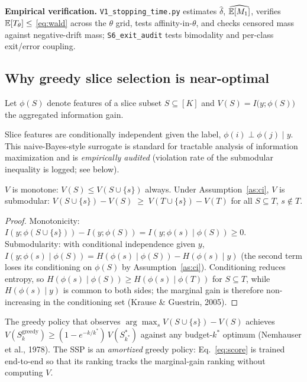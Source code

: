 \noindent\textbf{Empirical verification.} \texttt{V1\_stopping\_time.py}
estimates $\hat\delta$, $\widehat{\mathbb{E}[M_1]}$, verifies
$\mathbb{E}[T_\theta]\le$ \eqref{eq:wald} across the $\theta$ grid, tests
affinity-in-$\theta$, and checks censored mass against negative-drift mass;
\texttt{S6\_exit\_audit} tests bimodality and per-class exit/error coupling.

\subsection{Why greedy slice selection is near-optimal}

Let $\phi(S)$ denote features of a slice subset $S\subseteq[K]$ and
$V(S)=I\big(y;\phi(S)\big)$ the aggregated information gain.

\begin{assumption}\label{as:ci}
Slice features are conditionally independent given the label,
$\phi(i)\perp\phi(j)\mid y$. This naive-Bayes-style surrogate is standard
for tractable analysis of information maximization and is
\emph{empirically audited} (violation rate of the submodular inequality is
logged; see below).
\end{assumption}

\begin{theorem}\label{thm:submod}
$V$ is monotone: $V(S)\le V(S\cup\{s\})$ always. Under
Assumption~\ref{as:ci}, $V$ is submodular:
$V(S\cup\{s\})-V(S)\;\ge\;V(T\cup\{s\})-V(T)$ for all $S\subseteq T$,
$s\notin T$.
\end{theorem}
\begin{proof}
Monotonicity: $I(y;\phi(S\cup\{s\}))-I(y;\phi(S)) =
I(y;\phi(s)\mid\phi(S))\ge 0$. Submodularity: with conditional
independence given $y$,
$I(y;\phi(s)\mid \phi(S)) = H(\phi(s)\mid\phi(S)) - H(\phi(s)\mid y)$
(the second term loses its conditioning on $\phi(S)$ by
Assumption~\ref{as:ci}). Conditioning reduces entropy, so
$H(\phi(s)\mid\phi(S))\ge H(\phi(s)\mid\phi(T))$ for $S\subseteq T$, while
$H(\phi(s)\mid y)$ is common to both sides; the marginal gain is therefore
non-increasing in the conditioning set (Krause \& Guestrin, 2005).
\end{proof}

\begin{corollary}\label{cor:greedy}
The greedy policy that observes
$\arg\max_s V(S\cup\{s\})-V(S)$ achieves
$V(S^{\mathrm{greedy}}_k)\ge(1-e^{-k/k^\ast})\,V(S^\ast_{k^\ast})$ against
any budget-$k^\ast$ optimum (Nemhauser et al., 1978). The SSP is an
\emph{amortized} greedy policy: Eq.~\eqref{eq:score} is trained end-to-end
so that its ranking tracks the marginal-gain ranking without computing $V$.
\end{corollary}

